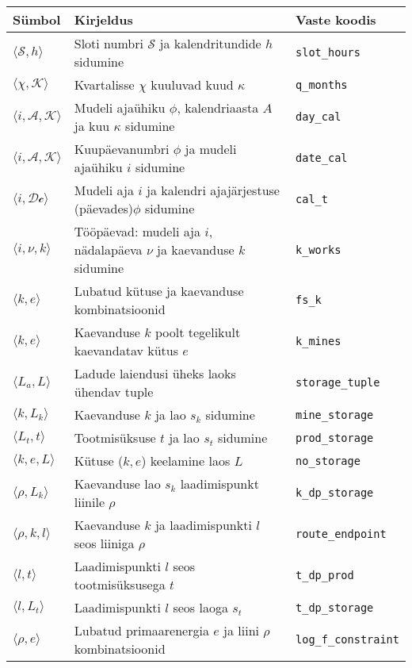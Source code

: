 \begin{table}
\begin{tabular}{l l l}
Sümbol & Kirjeldus & Vaste koodis\\
\hline
$\langle \mathcal{S}, h \rangle$ & Sloti numbri $\mathcal{S}$ ja kalendritundide $h$ sidumine & \texttt{slot\_hours} \\
$\langle \chi, \mathcal{K} \rangle$ & Kvartalisse $\chi$ kuuluvad kuud $\kappa$ & \texttt{q\_months} \\
$\langle i, \mathcal{A}, \mathcal{K} \rangle$& Mudeli ajaühiku $\phi$, kalendriaasta $A$ ja kuu $\kappa$ sidumine& \texttt{day\_cal} \\
$\langle i, \mathcal{A}, \mathcal{K} \rangle$& Kuupäevanumbri $\phi$ ja mudeli ajaühiku $i$ sidumine & \texttt{date\_cal} \\
$\langle i, \mathcal{Dc} \rangle$& Mudeli aja $i$ ja kalendri ajajärjestuse (päevades)$\phi$ sidumine & \texttt{cal\_t} \\
$\langle i, \nu, k \rangle$& Tööpäevad: mudeli aja $i$, nädalapäeva $\nu$ ja kaevanduse $k$ sidumine & \texttt{k\_works} \\

$\langle k, e \rangle$      & Lubatud kütuse ja kaevanduse kombinatsioonid & \texttt{fs\_k} \\ 
$\langle k, e \rangle$      & Kaevanduse $k$ poolt tegelikult kaevandatav kütus $e$ & \texttt{k\_mines} \\ 

$\langle L_a, L \rangle$    & Ladude laiendusi üheks laoks ühendav tuple & \texttt{storage\_tuple}\\
$\langle k, L_k \rangle$    & Kaevanduse $k$ ja lao $s_k$ sidumine  & \texttt{mine\_storage}\\
$\langle L_t, t \rangle$    & Tootmisüksuse $t$ ja lao $s_t$ sidumine  & \texttt{prod\_storage}\\
$\langle k, e, L \rangle$   & Kütuse ($k,e$) keelamine laos $L$  & \texttt{no\_storage}\\
$\langle \rho, L_k \rangle$ & Kaevanduse lao $s_k$ laadimispunkt liinile $\rho$  & \texttt{k\_dp\_storage}\\
$\langle \rho, k, l \rangle$& Kaevanduse $k$ ja laadimispunkti $l$ seos liiniga $\rho$  & \texttt{route\_endpoint}\\
$\langle l, t \rangle$      & Laadimispunkti $l$ seos tootmisüksusega $t$& \texttt{t\_dp\_prod}\\                       
$\langle l, L_t \rangle$    & Laadimispunkti $l$ seos laoga $s_t$ & \texttt{t\_dp\_storage}\\
$\langle \rho, e \rangle$   & Lubatud primaarenergia $e$ ja liini $\rho$ kombinatsioonid & \texttt{log\_f\_constraint}\\


\end{tabular}
\end{table}
